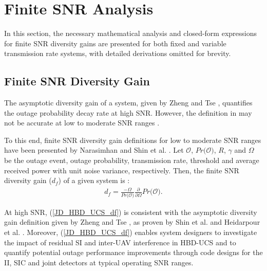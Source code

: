 \section{Finite SNR Analysis}

In this section, the necessary mathematical analysis and closed-form expressions for finite SNR diversity gains are presented for both fixed and variable transmission rate systems, with detailed derivations omitted for brevity.
\subsection{Finite SNR Diversity Gain}

The asymptotic diversity gain of a system, given by Zheng and Tse \cite[eq. (3)]{zheng2003diversity}, quantifies the outage probability decay rate at high SNR. However, the definition in \cite[eq. (3)]{zheng2003diversity} may not be accurate at low to moderate SNR ranges \cite{shin2008diversity}. 

To this end, finite SNR diversity gain definitions for low to moderate SNR ranges have been presented by Narasimhan \cite[eq. (5)]{narasimhan2006finite} and Shin et al. \cite{shin2008diversity}. Let $\mathcal{O}$, $Pr\big(\mathcal{O}\big)$, $R$, $\gamma$ and $\Omega$ be the outage event, outage probability, transmission rate, threshold and average received power with unit noise variance, respectively. Then, the finite SNR diversity gain ($d_f$) of a given system is \cite[eq. (5)]{narasimhan2006finite}:
\begin{eqnarray} \label{JD_HBD_UCS_df}
d_f = \frac{-\Omega}{Pr\big(\mathcal{O}\big)}\frac{\partial}{\partial\Omega}Pr\big(\mathcal{O}\big).
\end{eqnarray}

At high SNR, (\ref{JD_HBD_UCS_df}) is consistent with the asymptotic diversity gain definition given by Zheng and Tse \cite{zheng2003diversity}, as proven by Shin et al. \cite{shin2008diversity} and Heidarpour et al. \cite{heidarpour2017finite}. Moreover, (\ref{JD_HBD_UCS_df}) enables system designers to investigate the impact of residual SI and inter-UAV interference in HBD-UCS and to quantify potential outage performance improvements through code designs for the II, SIC and joint detectors at typical operating SNR ranges. 

